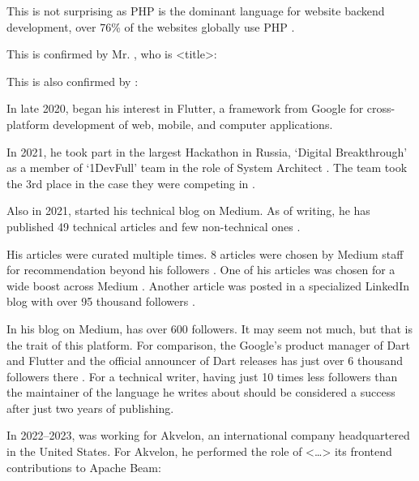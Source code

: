 This is not surprising as PHP is the dominant language for website backend development,
over 76\% of the websites globally use PHP .

This is confirmed by Mr. \MrPhpOne, who is <title>:


This is also confirmed by \MrPhpTwoT:


In late 2020, \mrl began his interest in Flutter, a framework from Google for cross-platform
development of web, mobile, and computer applications.

In 2021, he took part in the largest Hackathon in Russia, `Digital Breakthrough'
as a member of `1DevFull' team in the role of System Architect .
The team took the 3rd place in the case they were competing in .

Also in 2021, \mrl started his technical blog on Medium.
As of writing, he has published 49 technical articles %
and few non-technical ones
.

His articles were curated multiple times.
8 articles were chosen by Medium staff for recommendation beyond his followers .
One of his articles was chosen for a wide boost across Medium .
Another article was posted in a specialized LinkedIn blog with over 95 thousand followers .

In his blog on Medium, \mrl has over 600 followers. %
It may seem not much, but that is the trait of this platform.
For comparison, the Google's product manager of Dart and Flutter
and the official announcer of Dart releases has just over 6 thousand followers there
.
For a technical writer, having just 10 times less followers %
than the maintainer of the language
he writes about should be considered a success after just two years of publishing.

In 2022--2023, \mrl was working for Akvelon, an international company headquartered in the United States.
For Akvelon, he performed the role of <\dots>
its frontend contributions to Apache Beam:

